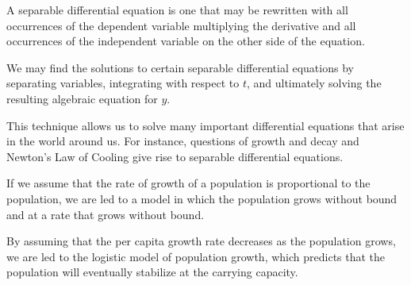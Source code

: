 

\begin{summary}
\item A separable differential equation is one that may be rewritten
  with all occurrences of the dependent variable multiplying the
  derivative and all occurrences of the independent variable on the
  other side of the equation.
\item We may find the solutions to certain separable differential equations
  by separating variables, integrating with respect to $t$, and ultimately solving the resulting algebraic equation for $y$.
 
\item This technique allows us to solve many important differential
  equations that arise in the world around us.  For instance, questions of
  growth and decay and Newton's Law of Cooling give rise to separable
  differential equations.  

\item If we assume that the rate of growth of a population is
  proportional to the population, we are led to a model in which the
  population grows without bound and at a  rate that grows without bound. 
\item By assuming that the per capita growth rate decreases as the
  population grows, we are led to the logistic model of population
  growth, which predicts that the population will eventually
  stabilize at the carrying capacity.    
\end{summary}

\clearpage

 

\cleardoublepage